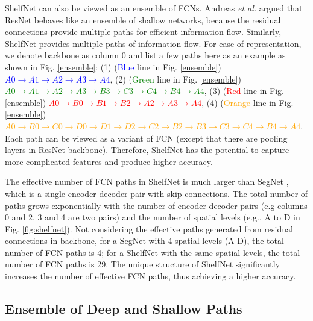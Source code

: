 \documentclass[10pt,twocolumn,letterpaper]{article}
\begin{document}
ShelfNet can also be viewed as an ensemble of FCNs. Andreas \textit{et al.} \cite{veit2016residual} argued that ResNet behaves like an ensemble of shallow networks, because the residual connections provide multiple paths for efficient information flow.  Similarly, ShelfNet provides multiple paths of information flow. For ease of representation, we denote backbone as column 0 and list a few paths here as an example as shown in Fig. \ref{ensemble}: (1) (\textcolor{blue}{Blue} line in Fig. \ref{ensemble}) \textcolor{blue}{  $A0 \rightarrow A1 \rightarrow A2 \rightarrow A3 \rightarrow A4$}, (2) (\textcolor{green}{Green} line in Fig. \ref{ensemble}) \textcolor{green}{ $A0 \rightarrow A1 \rightarrow A2 \rightarrow A3 \rightarrow B3 \rightarrow C3 \rightarrow C4 \rightarrow B4 \rightarrow A4$}, (3) (\textcolor{red}{Red} line in Fig. \ref{ensemble})\textcolor{red}{ $A0 \rightarrow B0 \rightarrow B1 \rightarrow B2 \rightarrow A2 \rightarrow A3 \rightarrow A4$}, (4) (\textcolor{orange}{Orange} line in Fig. \ref{ensemble}) \textcolor{orange}{$A0 \rightarrow B0 \rightarrow C0 \rightarrow D0 \rightarrow D1 \rightarrow D2 \rightarrow C2 \rightarrow B2 \rightarrow B3 \rightarrow C3 \rightarrow C4 \rightarrow B4 \rightarrow A4$}. Each path can be viewed as a variant of FCN (except that there are pooling layers in ResNet backbone).  Therefore, ShelfNet has the potential to capture more complicated features and produce higher accuracy.


The effective number of FCN paths in ShelfNet is much larger than SegNet \cite{badrinarayanan2015segnet}, which is a single encoder-decoder pair with skip connections. The total number of paths grows exponentially with the number of encoder-decoder pairs (e.g columns 0 and 2, 3 and 4 are two pairs) and the number of spatial levels (e.g., A to D in Fig. \ref{fig:shelfnet}). Not considering the effective paths generated from residual connections in backbone, for a SegNet with 4 spatial levels (A-D), the total number of FCN paths is 4; for a ShelfNet with the same spatial levels, the total number of FCN paths is 29. The unique structure of ShelfNet significantly increases the number of effective FCN paths, thus achieving a higher accuracy.  

\subsection{Ensemble of Deep and Shallow Paths}
\end{document}
